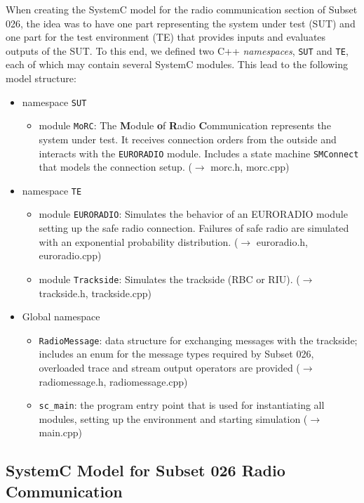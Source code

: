\documentclass{template/openetcs_article}
\begin{document}
When creating the SystemC model for the radio communication section of Subset 026, the idea was to have one part representing the system under test (SUT) and one part for the test environment (TE) that provides inputs and evaluates outputs of the SUT. To this end, we defined two C++ \emph{namespaces}, \verb|SUT| and \verb|TE|, each of which may contain several SystemC modules. This lead to the following model structure:
\begin{itemize}
  \item namespace \verb|SUT|
    \begin{itemize}
      \item module \verb|MoRC|: The \textbf{M}odule \textbf{o}f \textbf{R}adio \textbf{C}ommunication represents the system under test. It receives connection orders from the outside and interacts with the \verb|EURORADIO| module. Includes a state machine \verb|SMConnect| that models the connection setup. ($\rightarrow$ morc.h, morc.cpp)
    \end{itemize}

  \item namespace \verb|TE|
    \begin{itemize}
      \item module \verb|EURORADIO|: Simulates the behavior of an EURORADIO module setting up the safe radio connection. Failures of safe radio are simulated with an exponential probability distribution. ($\rightarrow$ euroradio.h, euroradio.cpp)
      \item module \verb|Trackside|: Simulates the trackside (RBC or RIU). ($\rightarrow$ trackside.h, trackside.cpp)
    \end{itemize}
  \item Global namespace
    \begin{itemize}
      \item \verb|RadioMessage|: data structure for exchanging messages with the trackside; includes an enum for the message types required by Subset 026, overloaded trace and stream output operators are provided ($\rightarrow$ radiomessage.h, radiomessage.cpp)
      \item \verb|sc_main|: the program entry point that is used for instantiating all modules, setting up the environment and starting simulation ($\rightarrow$ main.cpp)
    \end{itemize}
\end{itemize}



\subsection{SystemC Model for Subset 026 Radio Communication}
\end{document}
